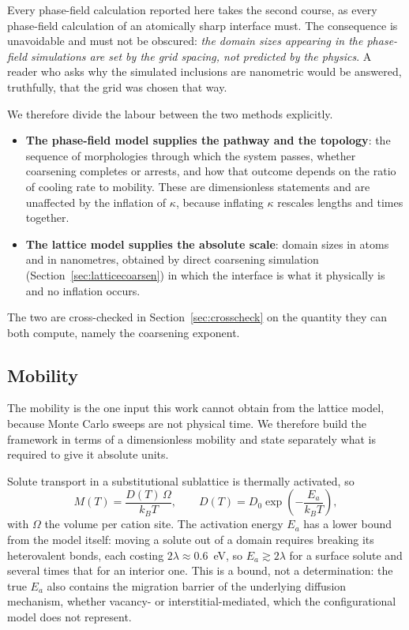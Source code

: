 \documentclass[preprint,12pt,authoryear]{elsarticle}
\begin{document}
Every phase-field calculation reported here takes the second course, as every
phase-field calculation of an atomically sharp interface must. The consequence
is unavoidable and must not be obscured: \emph{the domain sizes appearing in the
phase-field simulations are set by the grid spacing, not predicted by the
physics}. A reader who asks why the simulated inclusions are nanometric would be
answered, truthfully, that the grid was chosen that way.

We therefore divide the labour between the two methods explicitly.

\begin{itemize}\itemsep2pt
\item \textbf{The phase-field model supplies the pathway and the topology}: the
sequence of morphologies through which the system passes, whether coarsening
completes or arrests, and how that outcome depends on the ratio of cooling rate
to mobility. These are dimensionless statements and are unaffected by the
inflation of $\kappa$, because inflating $\kappa$ rescales lengths and times
together.
\item \textbf{The lattice model supplies the absolute scale}: domain sizes in
atoms and in nanometres, obtained by direct coarsening simulation
(Section~\ref{sec:latticecoarsen}) in which the interface is what it physically
is and no inflation occurs.
\end{itemize}

The two are cross-checked in Section~\ref{sec:crosscheck} on the quantity they
can both compute, namely the coarsening exponent.

\subsection{Mobility}
\label{sec:mobility}

The mobility is the one input this work cannot obtain from the lattice model,
because Monte Carlo sweeps are not physical time. We therefore build the
framework in terms of a dimensionless mobility and state separately what is
required to give it absolute units.

Solute transport in a substitutional sublattice is thermally activated, so
\begin{equation}
M(T) = \frac{D(T)\, \Omega}{k_B T}, \qquad
D(T) = D_0 \exp\!\left(-\frac{E_a}{k_B T}\right),
\label{eq:arrhenius}
\end{equation}
with $\Omega$ the volume per cation site. The activation energy $E_a$ has a
lower bound from the model itself: moving a solute out of a domain requires
breaking its heterovalent bonds, each costing $2\lambda \approx 0.6$~eV, so
$E_a \gtrsim 2\lambda$ for a surface solute and several times that for an
interior one. This is a bound, not a determination: the true $E_a$ also contains
the migration barrier of the underlying diffusion mechanism, whether vacancy- or
interstitial-mediated, which the configurational model does not represent.
\end{document}
